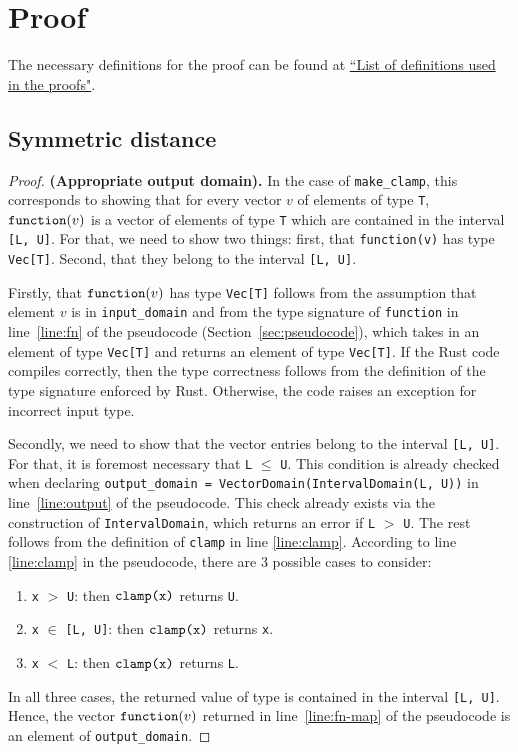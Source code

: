 \documentclass{article}
\begin{document}
\section{Proof}
The necessary definitions for the proof can be found at \href{https://www.overleaf.com/project/60d214e390b337703d200982}{``List of definitions used in the proofs"}.

\subsection{Symmetric distance}

\begin{proof}
\textbf{(Appropriate output domain).} In the case of \texttt{make\_clamp}, this corresponds to showing that for every vector $v$ of elements of type \texttt{T}, $\texttt{function}(v)$ is a vector of elements of type \texttt{T} which are contained in the interval \texttt{[L, U]}. For that, we need to show two things: first, that \texttt{function(v)} has type \texttt{Vec[T]}.
Second, that they belong to the interval \texttt{[L, U]}.

Firstly, that $\texttt{function}(v)$ has type \texttt{Vec[T]} follows from the assumption that element $v$ is in \texttt{input\_domain} and from the type signature of \texttt{function} in line~\ref{line:fn} of the pseudocode (Section~\ref{sec:pseudocode}), which takes in an element of type \texttt{Vec[T]} and returns an element of type \texttt{Vec[T]}. If the Rust code compiles correctly, then the type correctness follows from the definition of the type signature enforced by Rust. Otherwise, the code raises an exception for incorrect input type. 

Secondly, we need to show that the vector entries belong to the interval \texttt{[L, U]}. For that, it is foremost necessary that \texttt{L} $\leq$ \texttt{U}. This condition is already checked when declaring \texttt{output\_domain = VectorDomain(IntervalDomain(L, U))} in line~\ref{line:output} of the pseudocode. This check already exists via the construction of \texttt{IntervalDomain}, which returns an error if \texttt{L} $>$ \texttt{U}. The rest follows from the definition of \texttt{clamp} in line \ref{line:clamp}. According to line \ref{line:clamp} in the pseudocode, there are 3 possible cases to consider:
\begin{enumerate}
    \item \texttt{x} $>$ \texttt{U}: then $\texttt{clamp}\texttt{(x)}$ returns \texttt{U}.
    \item \texttt{x} $\in$ \texttt{[L, U]}: then $\texttt{clamp}\texttt{(x)}$ returns \texttt{x}.
    \item \texttt{x} $<$ \texttt{L}: then $\texttt{clamp}\texttt{(x)}$ returns \texttt{L}.
\end{enumerate}
In all three cases, the returned value of type \T is contained in the interval \texttt{[L, U]}. Hence, the vector $\texttt{function}(v)$ returned in line~\ref{line:fn-map} of the pseudocode is an element of \texttt{output\_domain}.


\end{proof}
\end{document}
